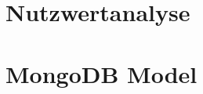 \begin{appendices}
\section{Nutzwertanalyse}
\label{appendix:nutzwertanalyse}

\begin{figure}[h]
\end{figure}
\newpage

\section{MongoDB Model}
\label{appendix:mongoose_model}

\begin{figure}[h]
\end{figure}



\end{appendices}
